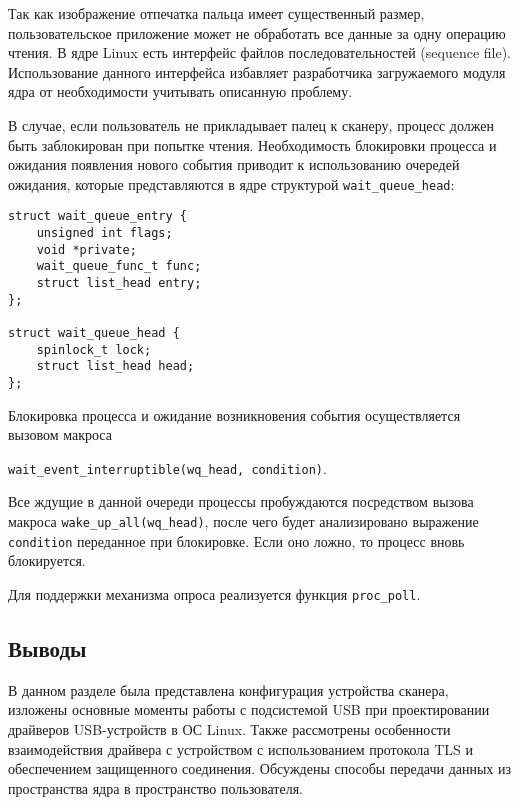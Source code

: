 Так как изображение отпечатка пальца имеет существенный размер, пользовательское приложение может не обработать все данные за одну операцию чтения.
В ядре Linux есть интерфейс файлов последовательностей (sequence file).
Использование данного интерфейса избавляет разработчика загружаемого модуля ядра от необходимости учитывать описанную проблему.


В случае, если пользователь не прикладывает палец к сканеру, процесс должен быть заблокирован при попытке чтения. Необходимость блокировки процесса и ожидания появления нового события приводит к использованию очередей ожидания, которые представляются в ядре структурой \texttt{wait\_queue\_head}:

\begin{small}
\begin{verbatim}
struct wait_queue_entry {
    unsigned int flags;
    void *private;
    wait_queue_func_t func;
    struct list_head entry;
};

struct wait_queue_head {
    spinlock_t lock;
    struct list_head head;
};
\end{verbatim}
\end{small}

Блокировка процесса и ожидание возникновения события осуществляется вызовом макроса

\texttt{wait\_event\_interruptible(wq\_head, condition)}.

Все ждущие в данной очереди процессы пробуждаются посредством вызова макроса \texttt{wake\_up\_all(wq\_head)}, после чего будет анализировано выражение \texttt{condition} переданное при блокировке. Если оно ложно, то процесс вновь блокируется.

Для поддержки механизма опроса реализуется функция \texttt{proc\_poll}.

\subsection*{Выводы}

В данном разделе была представлена конфигурация устройства сканера, изложены основные моменты работы с подсистемой USB при проектировании драйверов USB-устройств в ОС Linux. Также рассмотрены особенности взаимодействия драйвера с устройством с использованием протокола TLS и обеспечением защищенного соединения. Обсуждены способы передачи данных из пространства ядра в пространство пользователя.

